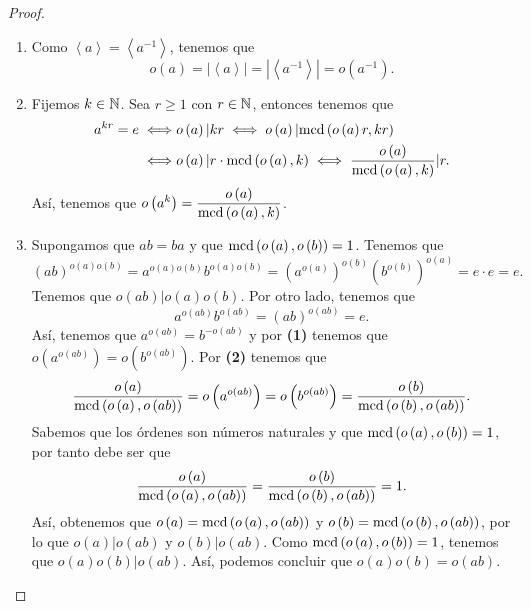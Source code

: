 \begin{proof}
\begin{enumerate}
\item Como $\displaystyle \left\langle a \right\rangle  = \left\langle a^{-1} \right\rangle  $, tenemos que
	\[o\left(a\right) = \left|\left\langle a \right\rangle \right| = \left|\left\langle a^{-1} \right\rangle \right| = o\left(a^{-1}\right) .\]
\item Fijemos $\displaystyle k\in \mathbb{N} $. Sea $\displaystyle r \geq 1 $ con $\displaystyle  r \in \mathbb{N} $, entonces tenemos que
\[
\begin{split}
	a^{kr } = e \iff & o\left(a\right) | kr \iff o\left(a\right) | \text{mcd}\left(o\left(a\right)r, kr\right) \\
	\iff & o\left(a\right) |r \cdot \text{mcd}\left(o\left(a\right), k\right) \iff \frac{o\left(a\right)}{\text{mcd}\left(o\left(a\right), k\right)} | r.
\end{split}
\]
Así, tenemos que $\displaystyle o\left(a^{k}\right) = \frac{o\left(a\right)}{\text{mcd}\left(o\left(a\right), k\right)} $.	
\item Supongamos que $\displaystyle ab = ba $ y que $\displaystyle \text{mcd}\left(o\left(a\right), o\left(b\right)\right) = 1 $. Tenemos que 
	\[\left(ab\right)^{o\left(a\right)o\left(b\right)} = a^{o\left(a\right)o\left(b\right)}b^{o\left(a\right)o\left(b\right)} = \left(a^{o\left(a\right)}\right)^{o\left(b\right)}\left(b^{o\left(b\right)}\right)^{o\left(a\right)} = e \cdot e = e .\]
Tenemos que $\displaystyle o\left(ab\right) | o\left(a\right)o\left(b\right) $. Por otro lado, tenemos que 
\[a^{o\left(ab\right)}b^{o\left(ab\right)} = \left(ab\right)^{o\left(ab\right)} = e .\]
Así, tenemos que $\displaystyle a^{o\left(ab\right)} = b^{-o\left(ab\right)} $ y por \textbf{(1)} tenemos que $\displaystyle o\left(a^{o\left(ab\right)}\right) = o\left(b^{o\left(ab\right)}\right) $. Por \textbf{(2)} tenemos que 
\[\frac{o\left(a\right)}{\text{mcd}\left(o\left(a\right), o\left(ab\right)\right)} = o\left(a^{o\left(ab\right)}\right) = o\left(b^{o\left(ab\right)}\right) = \frac{o\left(b\right)}{\text{mcd}\left(o\left(b\right), o\left(ab\right)\right)} .\]
Sabemos que los órdenes son números naturales y que $\displaystyle \text{mcd}\left(o\left(a\right), o\left(b\right)\right) = 1 $, por tanto debe ser que 
\[\frac{o\left(a\right)}{\text{mcd}\left(o\left(a\right), o\left(ab\right)\right)} = \frac{o\left(b\right)}{\text{mcd}\left(o\left(b\right), o\left(ab\right)\right)} = 1 .\]
Así, obtenemos que $\displaystyle o\left(a\right) = \text{mcd}\left(o\left(a\right), o\left(ab\right)\right) $ y $\displaystyle o\left(b\right) = \text{mcd}\left(o\left(b\right), o\left(ab\right)\right) $, por lo que $\displaystyle o\left(a\right) | o\left(ab\right) $ y $\displaystyle o\left(b\right) | o \left(ab\right) $. Como $\displaystyle \text{mcd}\left(o\left(a\right), o\left(b\right)\right) =1 $, tenemos que $\displaystyle o\left(a\right)o\left(b\right) |o\left(ab\right) $. Así, podemos concluir que $\displaystyle o\left(a\right)o\left(b\right)=o\left(ab\right) $.
\end{enumerate}
\end{proof}
